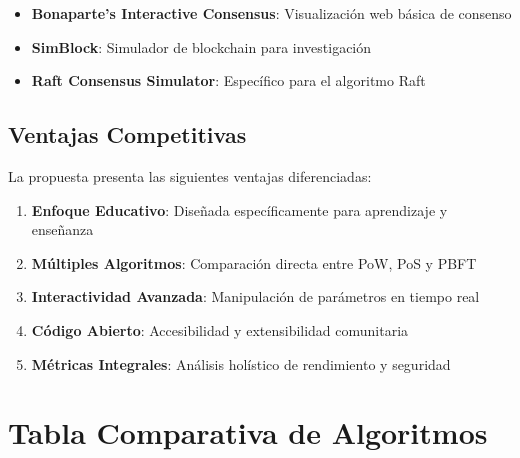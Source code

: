 \documentclass[spanish,12pt,letterpaper]{report}
\begin{document}
\begin{itemize}
    \item \textbf{Bonaparte's Interactive Consensus}: Visualización web básica de consenso \cite{bonaparte_interactive_consensus}
    \item \textbf{SimBlock}: Simulador de blockchain para investigación
    \item \textbf{Raft Consensus Simulator}: Específico para el algoritmo Raft \cite{raft_consensus_simulator}
\end{itemize}

\subsection{Ventajas Competitivas}

La propuesta presenta las siguientes ventajas diferenciadas:

\begin{enumerate}
    \item \textbf{Enfoque Educativo}: Diseñada específicamente para aprendizaje y enseñanza
    \item \textbf{Múltiples Algoritmos}: Comparación directa entre PoW, PoS y PBFT
    \item \textbf{Interactividad Avanzada}: Manipulación de parámetros en tiempo real
    \item \textbf{Código Abierto}: Accesibilidad y extensibilidad comunitaria
    \item \textbf{Métricas Integrales}: Análisis holístico de rendimiento y seguridad
\end{enumerate}

\section{Tabla Comparativa de Algoritmos}
\end{document}
